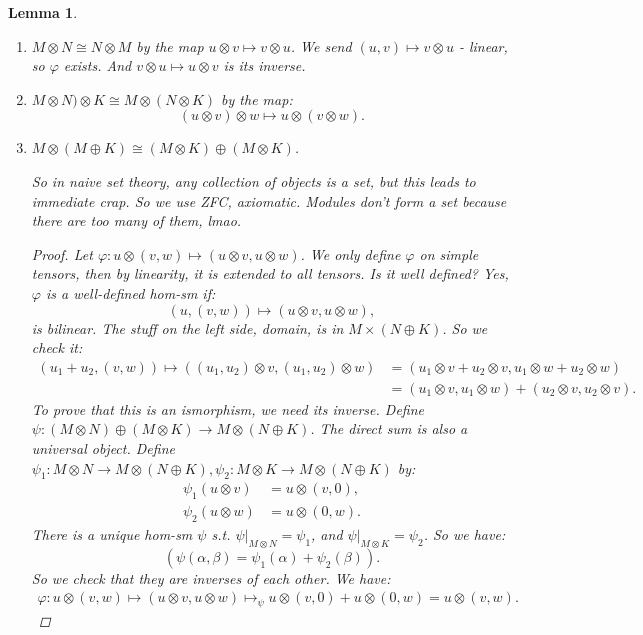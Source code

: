 \documentclass[12pt]{amsbook}
\theoremstyle{plain}
\numberwithin{section}{chapter}
\numberwithin{equation}{chapter}
\newtheorem{lem}[theorem]{Lemma}
\theoremstyle{definition}
\newtheorem{Ex}[theorem]{Example}
\theoremstyle{remark}
\newcommand{\z}{\mathbb{Z}}
\newcommand{\bee}{\begin{equation}\begin{aligned}}
\newcommand{\eee}{\end{aligned}\end{equation}}
\newcommand{\tens}{\otimes}
\renewcommand{\phi}{\varphi}
\begin{document}
\begin{lem}
\begin{enumerate}
\begin{proof}
\begin{Ex} The same tensor can be written in several ways as a sum of simple tensors, in $\z \tens \z$:
$$
5 \tens 6 = 2 \tens 6 + 3 \tens 6.
$$
The left hand side is sent to $30$, but we need it to be bilinear or something. 

\end{Ex}

So the inverse is a homomorphism, $M \to M \tens R$. It is an inverse, since if we start with a tensor, send it to the $v \tens 1$ in Equation \ref{eqn10.17}, we get: 
$$
\sum a_i(u_i \tens b_i) \mapsto^\phi \sum a_ib_iu_i \mapsto^{\phi^{-1}} (\sum a_ib_iu_i)\tens 1.
$$
\end{proof}

\item $M \tens N \cong N \tens M$ by the map $u \tens v \mapsto v \tens u$. We send $(u,v) \mapsto v \tens u$ - linear, so $\phi$ exists. And $v \tens u \mapsto u \tens v$ is its inverse. 

\item $M \tens N) \tens K \cong M \tens (N \tens K)$ by the map: 
$$
(u \tens v) \tens w \mapsto u \tens (v \tens w).
$$

\item $M \tens (M \oplus K) \cong (M \tens K) \oplus (M \tens K)$. 

So in naive set theory, any collection of objects is a set, but this leads to immediate crap. So we use ZFC, axiomatic. Modules don't form a set because there are too many of them, lmao. 

\begin{proof}
Let $\phi:u \tens (v,w) \mapsto (u\tens v,u \tens w)$. We only define $\phi$ on simple tensors, then by linearity, it is extended to all tensors. Is it well defined? Yes, $\phi$ is a well-defined hom-sm if:
$$
(u,(v,w)) \mapsto (u \tens v,u \tens w),
$$
 is bilinear. The stuff on the left side, domain, is  in $M \times (N \oplus K)$. So we check it: 
\bee
(u_1 + u_2,(v,w)) \mapsto ((u_1,u_2) \tens v,(u_1,u_2) \tens w) &= (u_1 \tens v + u_2 \tens v, u_1 \tens w + u_2 \tens w)\\
&= (u_1 \tens v,u_1 \tens w) + (u_2 \tens v, u_2 \tens v).
\eee
To prove that this is an ismorphism, we need its inverse. Define $\psi: (M \tens N) \oplus (M \tens K) \to M \tens (N \oplus K)$. The direct sum is also a universal object. Define $\psi_1: M \tens N \to M \tens (N \oplus K),\psi_2: M \tens K \to M \tens (N \oplus K)$ by: 
\bee
\psi_1(u \tens v) &= u \tens (v,0),\\
\psi_2(u \tens w) &= u \tens (0,w).
\eee
There is a unique hom-sm $\psi$ s.t. $\psi|_{M \tens N} = \psi_1$, and $\psi|_{M \tens K} = \psi_2$. So we have: 
$$
(\psi(\alpha,\beta) = \psi_1(\alpha) + \psi_2(\beta)).
$$
So we check that they are inverses of each other. We have: 
\bee
\phi:u \tens (v,w) \mapsto (u\tens v,u \tens w) \mapsto_\psi u \tens (v,0) + u \tens (0,w) = u \tens (v,w).
\eee
\end{proof}
\end{enumerate}
\end{lem}
\end{document}

